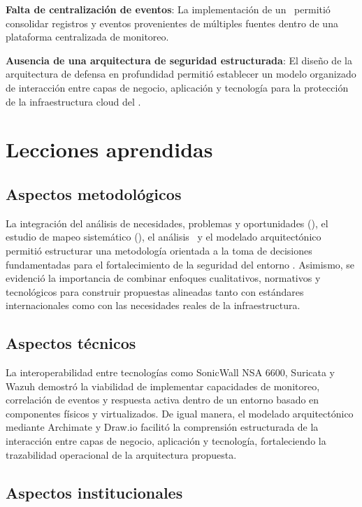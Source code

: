 \textbf{Falta de centralización de eventos}: La implementación de un \SIEM\ permitió consolidar registros y eventos provenientes de 
múltiples fuentes dentro de una plataforma centralizada de monitoreo.

\textbf{Ausencia de una arquitectura de seguridad estructurada}: El diseño de la arquitectura de defensa en profundidad permitió 
establecer un modelo organizado de interacción entre capas de negocio, aplicación y tecnología para la protección de la infraestructura 
cloud del \GRID.

\section{Lecciones aprendidas}
\noindent

\subsection{Aspectos metodológicos}
\noindent

La integración del análisis de necesidades, problemas y oportunidades (\NPO), el estudio de mapeo sistemático (\SMS), el análisis \DAR\ y 
el modelado arquitectónico permitió estructurar una metodología orientada a la toma de decisiones fundamentadas para el fortalecimiento de 
la seguridad del entorno \GRID. Asimismo, se evidenció la importancia de combinar enfoques cualitativos, normativos y tecnológicos para 
construir propuestas alineadas tanto con estándares internacionales como con las necesidades reales de la infraestructura.

\subsection{Aspectos técnicos}
\noindent

La interoperabilidad entre tecnologías como SonicWall NSA 6600, Suricata y Wazuh demostró la viabilidad de implementar capacidades de 
monitoreo, correlación de eventos y respuesta activa dentro de un entorno basado en componentes físicos y virtualizados. De igual manera, 
el modelado arquitectónico mediante Archimate y Draw.io facilitó la comprensión estructurada de la interacción entre capas de negocio, 
aplicación y tecnología, fortaleciendo la trazabilidad operacional de la arquitectura propuesta.

\subsection{Aspectos institucionales}
\noindent

